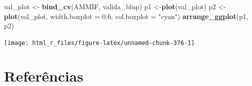 \documentclass[
]{book}
\newenvironment{Shaded}{\begin{snugshade}}{\end{snugshade}}
\newcommand{\DataTypeTok}[1]{\textcolor[rgb]{0.13,0.29,0.53}{#1}}
\newcommand{\FloatTok}[1]{\textcolor[rgb]{0.00,0.00,0.81}{#1}}
\newcommand{\KeywordTok}[1]{\textcolor[rgb]{0.13,0.29,0.53}{\textbf{#1}}}
\newcommand{\NormalTok}[1]{#1}
\newcommand{\StringTok}[1]{\textcolor[rgb]{0.31,0.60,0.02}{#1}}
\numberwithin{equation}{section}
\begin{document}
\begin{Shaded}
\begin{Highlighting}[]
\NormalTok{val\_plot \textless{}{-}}\StringTok{ }\KeywordTok{bind\_cv}\NormalTok{(AMMIF, valida\_blup)}
\NormalTok{p1 \textless{}{-}}\KeywordTok{plot}\NormalTok{(val\_plot)}
\NormalTok{p2 \textless{}{-}}\KeywordTok{plot}\NormalTok{(val\_plot,}
          \DataTypeTok{width.boxplot =} \FloatTok{0.6}\NormalTok{,}
          \DataTypeTok{col.boxplot =} \StringTok{"cyan"}\NormalTok{)}
\KeywordTok{arrange\_ggplot}\NormalTok{(p1, p2)}
\end{Highlighting}
\end{Shaded}

\begin{center}\texttt{[image: html\_r\_files/figure-latex/unnamed-chunk-376-1]} \end{center}

\hypertarget{referuxeancias}{%
\chapter{Referências}\label{referuxeancias}}

\setlength{\parindent}{0in}

\setlength{\parskip}{8pt}

\noindent
\end{document}
